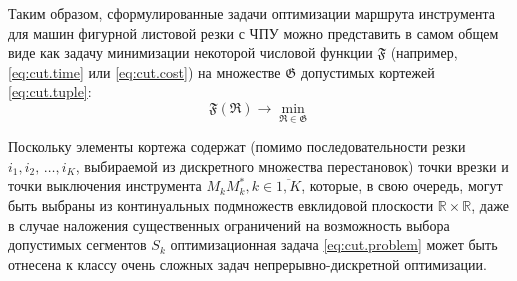 Таким образом, сформулированные задачи оптимизации
маршрута инструмента для машин фигурной листовой резки с ЧПУ
можно представить в самом общем виде
как задачу минимизации некоторой числовой функции $\mathfrak F$
(например, \eqref{eq:cut.time} или \eqref{eq:cut.cost})
на множестве
$\mathfrak G$ допустимых кортежей
\eqref{eq:cut.tuple}:
\begin{equation}
  \mathfrak F(\mathfrak R) \to \min_{\mathfrak R \in \mathfrak G}
  \label{eq:cut.problem}
\end{equation}

Поскольку элементы кортежа содержат
(помимо последовательности резки
$i_1, i_2, \,\dots, i_K$,
выбираемой из дискретного множества перестановок)
точки врезки и точки выключения инструмента
$M_kM_k^*, k \in \overline{1,K}$,
которые, в свою очередь,
могут быть выбраны из континуальных подмножеств евклидовой плоскости
$\mathbb R \times \mathbb R$,
даже в случае наложения существенных ограничений
на возможность выбора допустимых сегментов
$S_k$
оптимизационная задача \eqref{eq:cut.problem}
может быть отнесена к классу очень сложных задач
непрерывно-дискретной оптимизации.
